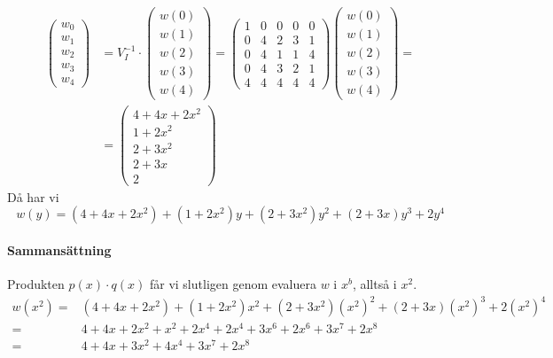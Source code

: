 \begin{align*}
  \begin{pmatrix}
    w_0 \\
    w_1 \\
    w_2 \\
    w_3 \\
    w_4
  \end{pmatrix} & =
  V_I^{-1} \cdot \begin{pmatrix}
    w(0) \\
    w(1) \\
    w(2) \\
    w(3) \\
    w(4)
  \end{pmatrix} =
  \begin{pmatrix}
    1 & 0 & 0 & 0 & 0 \\
    0 & 4 & 2 & 3 & 1 \\
    0 & 4 & 1 & 1 & 4 \\
    0 & 4 & 3 & 2 & 1 \\
    4 & 4 & 4 & 4 & 4
  \end{pmatrix}
  \begin{pmatrix}
    w(0) \\
    w(1) \\
    w(2) \\
    w(3) \\
    w(4)
  \end{pmatrix} = \\
  &= \begin{pmatrix}
    4 + 4x + 2x^2 \\
    1 + 2x^2 \\
    2 + 3x^2 \\
    2 + 3x \\
    2
  \end{pmatrix}
\end{align*}
Då har vi
\begin{equation*}
  w(y) = (4 + 4x + 2x^2) + (1 + 2x^2)y + (2 + 3x^2)y^2 + (2 + 3x)y^3 + 2y^4
\end{equation*}

\paragraph{Sammansättning}
Produkten $p(x) \cdot q(x)$ får vi slutligen genom evaluera $w$ i
$x^b$, alltså i $x^2$.
\begin{align*}
  w(x^2) =& (4 + 4x + 2x^2) + (1 + 2x^2)x^2 + (2 + 3x^2)(x^2)^2 + (2 + 3x)(x^2)^3 + 2(x^2)^4 \\
         =& 4 + 4x + 2x^2 + x^2 + 2x^4 + 2x^4 + 3x^6 + 2x^6 + 3x^7 + 2x^8 \\
         =& 4 + 4x + 3x^2 + 4x^4 + 3x^7 + 2x^8
\end{align*}
